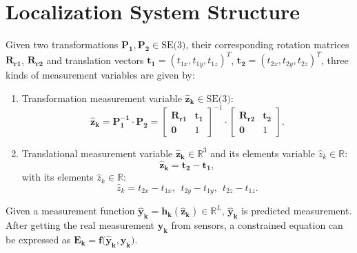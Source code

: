 \documentclass[journal]{IEEEtran}
\begin{document}
\section{Localization System Structure}\label{a4}
Given two transformations $\mathbf{P_1}, \mathbf{P_2} \in \text{SE(3)}$, their corresponding rotation matrices $\mathbf{R_{r1}}$, $\mathbf{R_{r2}}$ and translation vectors $\mathbf{t_1}={(t_{1x},t_{1y},t_{1z})}^{T}$, $\mathbf{t_2}={(t_{2x},t_{2y},t_{2z})}^{T}$,
three kinds of measurement variables are given by:
\begin{enumerate}
	\item Transformation measurement variable $\mathbf {\hat {z}_{k}} \in \text{SE(3)}$: 
	\begin{equation}\label{6}
	\mathbf {\hat {z}_{k} = P_1^{-1}\cdot P_2} =  \left[\begin{array}{cc}
	\mathbf{R_{r1}}  & \mathbf{t_1} \\
	\mathbf{0}  &  1 
	\end{array}\right]^{-1}\cdot \left[\begin{array}{cc}
	\mathbf{R_{r2}}  & \mathbf{t_2} \\
	\mathbf{0}  &  1 
	\end{array}\right].
	\end{equation}
	\item Translational measurement variable $\mathbf {\hat {z}_{k}} \in \mathbb{R}^{3}$ and its elements variable ${\hat {z}_{k}} \in \mathbb{R}$:
	\begin{equation}\label{8}
	\mathbf {\hat{z}_{k}} = \mathbf{t_2}-\mathbf{t_1},
	\end{equation}
	 with its elements ${\hat {z}_{k}} \in \mathbb{R}$:
	\begin{equation}\label{9}
	\hat{z}_{k} = t_{2x}-t_{1x},\ \ t_{2y}-t_{1y}, \ \ t_{2z}-t_{1z}.
	\end{equation}
\end{enumerate}
Given a measurement function $\mathbf {\hat{y}_{k} = h_k(\hat{z}_{k})} \in \mathbb{R}^{L}$, $\mathbf {\hat{y}_{k}}$ is predicted measurement. After getting the real measurement $\mathbf {y_k}$ from sensors, a constrained equation can be expressed as $\mathbf {E_k = f(\hat{y}_{k},{y}_{k}})$.
\end{document}
